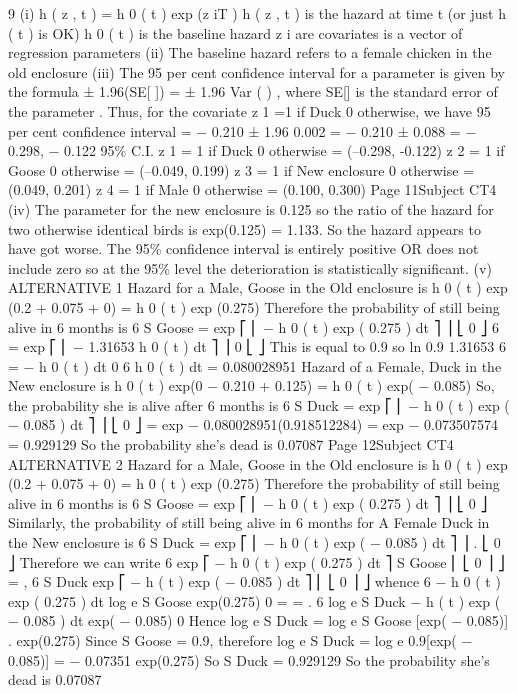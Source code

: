 9
(i)
h ( z , t ) = h 0 ( t ) exp (\beta z iT )
h ( z , t ) is the hazard at time t (or just h ( t ) is OK)
h 0 ( t ) is the baseline hazard
z i are covariates
\beta is a vector of regression parameters
(ii) The baseline hazard refers to a female chicken in the old enclosure
(iii) The 95 per cent confidence interval for a parameter \beta is given by
the formula
\beta ± 1.96(SE[ \beta ]) = \beta ± 1.96 Var ( \beta ) ,
where SE[\beta] is the standard error of the parameter \beta.
Thus, for the covariate z 1 =1 if Duck 0 otherwise, we have
95 per cent confidence interval =
− 0.210 ± 1.96 0.002 = − 0.210 ± 0.088 = { − 0.298, − 0.122}
95\% C.I.
z 1 = 1 if Duck 0 otherwise  = (–0.298, -0.122)
z 2 = 1 if Goose 0 otherwise  = (–0.049, 0.199)
z 3 = 1 if New enclosure 0 otherwise  = (0.049, 0.201)
z 4 = 1 if Male 0 otherwise  = (0.100, 0.300)
Page 11Subject CT4 %
(iv)
The parameter for the new enclosure is 0.125 so the
ratio of the hazard for two otherwise identical birds is
exp(0.125) = 1.133.
So the hazard appears to have got worse.
The 95\% confidence interval is entirely positive OR does not
include zero
so at the 95\% level the deterioration is statistically significant.
(v)
ALTERNATIVE 1
Hazard for a Male, Goose in the Old enclosure is
h 0 ( t ) exp (0.2 + 0.075 + 0) = h 0 ( t ) exp (0.275)
Therefore the probability of still being alive in 6 months is
6
S Goose = exp ⎡ ⎢ − \int h 0 ( t ) exp ( 0.275 ) dt ⎤ ⎥
⎣ 0
⎦
6
= exp ⎡ ⎢ − 1.31653 \int h 0 ( t ) dt ⎤ ⎥
0
⎣
⎦
This is equal to 0.9 so
ln 0.9
1.31653
6
= − \int h 0 ( t ) dt
0
6
 h 0 ( t ) dt = 0.080028951
Hazard of a Female, Duck in the New enclosure is
h 0 ( t ) exp(0 − 0.210 + 0.125) = h 0 ( t ) exp( − 0.085)
So, the probability she is alive after 6 months is
6
S Duck = exp ⎡ ⎢ − \int h 0 ( t ) exp ( − 0.085 ) dt ⎤ ⎥
⎣ 0
⎦
= exp { − 0.080028951(0.918512284) }
= exp { − 0.073507574 }
= 0.929129
So the probability she’s dead is 0.07087
Page 12Subject CT4 %
ALTERNATIVE 2
Hazard for a Male, Goose in the Old enclosure is
h 0 ( t ) exp (0.2 + 0.075 + 0) = h 0 ( t ) exp (0.275)
Therefore the probability of still being alive in 6 months is
6
S Goose = exp ⎡ ⎢ − \int h 0 ( t ) exp ( 0.275 ) dt ⎤ ⎥
⎣ 0
⎦
Similarly, the probability of still being alive in 6 months for
A Female Duck in the New enclosure is
6
S Duck = exp ⎡ ⎢ − \int h 0 ( t ) exp ( − 0.085 ) dt ⎤ ⎥ .
⎣ 0
⎦
Therefore we can write
6
exp ⎡ − \int h 0 ( t ) exp ( 0.275 ) dt ⎤
S Goose
⎢ ⎣ 0
⎥ ⎦
=
,
6
S Duck exp ⎡ − h ( t ) exp ( − 0.085 ) dt ⎤
⎢ ⎣  0
⎥ ⎦
whence
6
− \int h 0 ( t ) exp ( 0.275 ) dt
log e S Goose
exp(0.275)
0
=
=
.
6
log e S Duck − h ( t ) exp ( − 0.085 ) dt exp( − 0.085)
0
Hence
log e S Duck =
log e S Goose [exp( − 0.085)]
.
exp(0.275)
Since S Goose = 0.9, therefore
log e S Duck =
log e 0.9[exp( − 0.085)]
= − 0.07351
exp(0.275)
So S Duck = 0.929129
So the probability she’s dead is 0.07087
